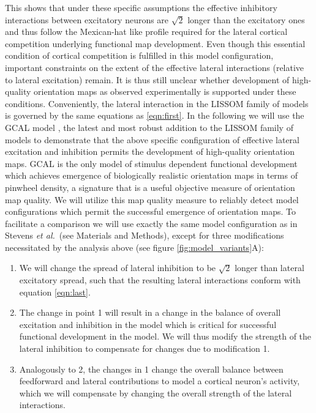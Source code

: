 \documentclass[utf8]{frontiersSCNS}
\newcommand{\etal}{\textit{et al.}}
\begin{document}
This shows that under these specific assumptions the effective inhibitory interactions between excitatory neurons are $\sqrt{2}$ longer than the excitatory ones and thus follow the Mexican-hat like profile required for the lateral cortical competition underlying functional map development. Even though this essential condition of cortical competition is fulfilled in this model configuration, important constraints on the extent of the effective lateral
interactions (relative to lateral excitation) remain. It is thus still unclear whether development of high-quality orientation maps as observed experimentally is supported under these conditions. Conveniently, the lateral interaction in the LISSOM family of models is governed by the same equations as \ref{eqn:first}. In the following we will use the GCAL model \citep{Stevens2013}, the latest and most robust addition to the LISSOM family of models to demonstrate that the above specific configuration of effective lateral excitation and inhibition permits the development of high-quality orientation maps. GCAL is the only model of stimulus dependent functional development which achieves emergence of biologically realistic 
orientation maps in terms of pinwheel density, a signature that is a useful objective measure of orientation map quality. We will utilize this
map quality measure to reliably detect model configurations which permit the successful emergence of orientation maps.
To facilitate a comparison we will use exactly the same model configuration 
as in Stevens \etal\,\citep{Stevens2013} (see Materials and Methods), except for three modifications necessitated by the analysis above (see figure \ref{fig:model_variants}A):

\begin{enumerate}

\item We will change the spread of lateral inhibition to be $\sqrt{2}$ longer than lateral excitatory spread, such that the resulting lateral
interactions conform with equation \ref{eqn:last}.

\item The change in point 1 will result in a change in the balance of overall excitation and inhibition in the model which is critical 
for successful functional development in the model. We will thus modify the strength of the lateral inhibition to compensate for changes due to modification 1.

\item Analogously to 2, the changes in 1 change the overall balance between feedforward and lateral contributions to model a cortical neuron's activity, 
which we will compensate by changing the overall strength of the lateral interactions.

\end{enumerate} 
\end{document}
